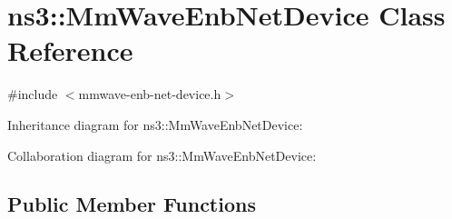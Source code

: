 \hypertarget{classns3_1_1MmWaveEnbNetDevice}{}\section{ns3\+:\+:Mm\+Wave\+Enb\+Net\+Device Class Reference}
\label{classns3_1_1MmWaveEnbNetDevice}


{\ttfamily \#include $<$mmwave-\/enb-\/net-\/device.\+h$>$}



Inheritance diagram for ns3\+:\+:Mm\+Wave\+Enb\+Net\+Device\+:


Collaboration diagram for ns3\+:\+:Mm\+Wave\+Enb\+Net\+Device\+:
\subsection*{Public Member Functions}
